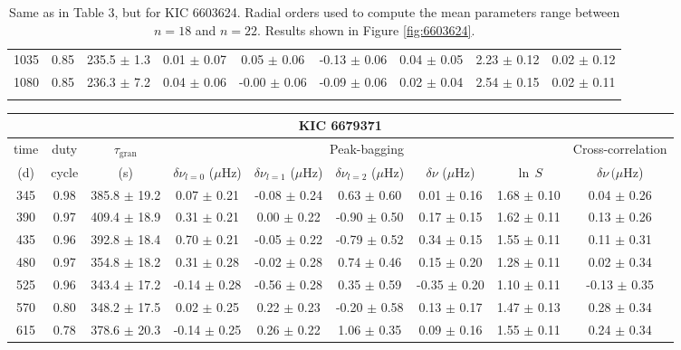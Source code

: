 \documentclass[twocolumn]{aastex61}%
\begin{document}
\begin{table*}[ht]
\begin{tabular}{ccc|ccccc|c}
1035 & 0.85 & 235.5 $\pm$ 1.3 & 0.01 $\pm$ 0.07 & 0.05 $\pm$ 0.06 & -0.13 $\pm$ 0.06 & 0.04 $\pm$ 0.05 & 2.23 $\pm$ 0.12 & 0.02 $\pm$ 0.12\\
1080 & 0.85 & 236.3 $\pm$ 7.2 & 0.04 $\pm$ 0.06 & -0.00 $\pm$ 0.06 & -0.09 $\pm$ 0.06 & 0.02 $\pm$ 0.04 & 2.54 $\pm$ 0.15 & 0.02 $\pm$ 0.11\\\vspace{-0.3cm}
\end{tabular}
\caption{Same as in Table 3, but for KIC 6603624. Radial orders used to compute the mean parameters range between $n=18$ and $n=22$. Results shown in Figure \ref{fig:6603624}.}\label{tab:6603624}\vspace{-0.1cm}
\end{table*}

\begin{table*}[ht]\centering\fontsize{9.}{7.}\selectfont
\begin{tabular}{ccc|ccccc|c}
\multicolumn{9}{c}{KIC 6679371}\\ \hline\hline
time & duty & $\tau_\text{gran}$ &\multicolumn{5}{c|}{Peak-bagging}&Cross-correlation\\
(d)& cycle & (s)&$\delta\nu_{l=0}$ ($\mu$Hz) & $\delta\nu_{l=1}$ ($\mu$Hz) & $\delta\nu_{l=2}$ ($\mu$Hz) & $\delta\nu$ ($\mu$Hz)& $\ln\,S$ & $\delta\nu\,(\mu$Hz)\\\hline
345 & 0.98 & 385.8 $\pm$ 19.2 & 0.07 $\pm$ 0.21 & -0.08 $\pm$ 0.24 & 0.63 $\pm$ 0.60 & 0.01 $\pm$ 0.16 & 1.68 $\pm$ 0.10 & 0.04 $\pm$ 0.26\\
390 & 0.97 & 409.4 $\pm$ 18.9 & 0.31 $\pm$ 0.21 & 0.00 $\pm$ 0.22 & -0.90 $\pm$ 0.50 & 0.17 $\pm$ 0.15 & 1.62 $\pm$ 0.11 & 0.13 $\pm$ 0.26\\
435 & 0.96 & 392.8 $\pm$ 18.4 & 0.70 $\pm$ 0.21 & -0.05 $\pm$ 0.22 & -0.79 $\pm$ 0.52 & 0.34 $\pm$ 0.15 & 1.55 $\pm$ 0.11 & 0.11 $\pm$ 0.31\\
480 & 0.97 & 354.8 $\pm$ 18.2 & 0.31 $\pm$ 0.28 & -0.02 $\pm$ 0.28 & 0.74 $\pm$ 0.46 & 0.15 $\pm$ 0.20 & 1.28 $\pm$ 0.11 & 0.02 $\pm$ 0.34\\
525 & 0.96 & 343.4 $\pm$ 17.2 & -0.14 $\pm$ 0.28 & -0.56 $\pm$ 0.28 & 0.35 $\pm$ 0.59 & -0.35 $\pm$ 0.20 & 1.10 $\pm$ 0.11 & -0.13 $\pm$ 0.35\\
570 & 0.80 & 348.2 $\pm$ 17.5 & 0.02 $\pm$ 0.25 & 0.22 $\pm$ 0.23 & -0.20 $\pm$ 0.58 & 0.13 $\pm$ 0.17 & 1.47 $\pm$ 0.13 & 0.28 $\pm$ 0.34\\
615 & 0.78 & 378.6 $\pm$ 20.3 & -0.14 $\pm$ 0.25 & 0.26 $\pm$ 0.22 & 1.06 $\pm$ 0.35 & 0.09 $\pm$ 0.16 & 1.55 $\pm$ 0.11 & 0.24 $\pm$ 0.34\\

\end{tabular}
\end{table*}
\end{document}
